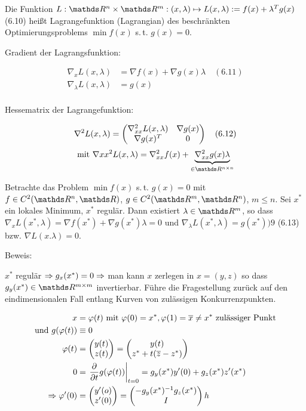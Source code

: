 
Die Funktion $L: \R^n \times \R^m: (x,\lambda) \mapsto L(x,\lambda) := f(x) + \lambda^T g(x)$ (6.10) heißt Lagrangefunktion (Lagrangian) des beschränkten Optimierungsproblems $\min f(x) $ s.\,t. $g(x)=0$.


Gradient der Lagrangsfunktion:

\begin{align*}
\nabla_x L(x,\lambda) &= \nabla f(x) + \nabla g(x) \lambda \quad (6.11) \\
\nabla_\lambda L(x,\lambda) &= g(x) \\
\end{align*}

Hessematrix der Lagrangefunktion:

\[ \nabla^2 L(x,\lambda) = \begin{pmatrix} \nabla_{xx}^2 L(x,\lambda) & \nabla g(x) \\ \nabla g(x)^T & 0 \end{pmatrix} \quad (6.12) \]
\[ \text{mit } \nabla{xx}^2 L(x,\lambda) = \nabla_{xx}^2 f(x) + \underbrace{\nabla_{xx}^2 g(x) \lambda}_{\in \R^{n\times n}} \]


Betrachte das Problem $\min f(x)$ s.\,t. $g(x)=0$ mit $f\in C^2(\R^n,\R)$, $g \in C^2(\R^m, \R^n)$, $m \leq n$. Sei $x^*$ ein lokales Minimum, $x^*$ regulär. Dann existiert $\lambda \in \R^m$, so dass $\nabla_x L(x^*,\lambda) = \nabla f(x^*) + \nabla g(x^*) \lambda = 0$ und $\nabla_\lambda L(x^*, \lambda) = g(x^*) ) 9$ (6.13) bzw. $\nabla L(x.\lambda)=0$.

Beweis:

$x^*$ regulär $\Rightarrow g_x(x^*) = 0 \Rightarrow $ man kann $x$ zerlegen in $x = (y,z)$ so dass $g_y(x^*) \in \R^{m\times m}$ invertierbar. Führe die Fragestellung zurück auf den eindimensionalen Fall entlang Kurven von zulässigen Konkurrenzpunkten.

\begin{align*}
x &= \varphi(t) \text{ mit } \varphi(0) = x^*, \varphi(1) = \overline x \neq x^* \text{ zulässiger Punkt} \\
\text{und } g(\varphi(t)) &\equiv 0 \\
\varphi(t) &= \begin{pmatrix} y(t) \\ z(t) \end{pmatrix} = \begin{pmatrix} y(t) \\ z^* + t(\overline z - z^*) \end{pmatrix} \\
0 &= \left. \frac{\partial}{\partial t} g(\varphi(t))\right|_{t=0} = g_y(x^*) y'(0) + g_z(x^*) z'(x^*) \\
\Rightarrow \varphi'(0) &= \begin{pmatrix} y'(o) \\ z'(0) \end{pmatrix} = \begin{pmatrix} -g_y(x^*)^{-1} g_z(x^*) \\ I \end{pmatrix} h \\
\end{align*}

